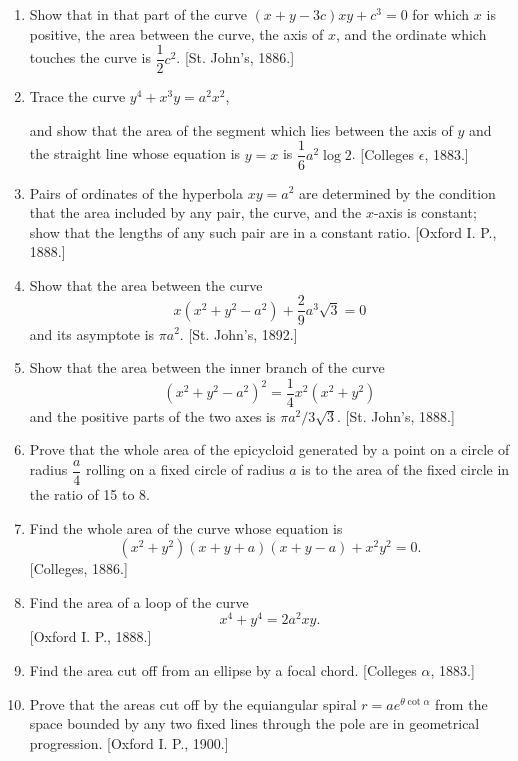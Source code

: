 \documentclass[11pt, a4paper]{article}
\newcommand{\source}[1]{\hfill\textnormal{[#1]}}
\begin{document}
\begin{enumerate}[leftmargin=2em]
\item Show that in that part of the curve $(x+y-3c)xy+c^3=0$ for which $x$ is positive, the area between the curve, the axis of $x$, and the ordinate which touches the curve is $\dfrac12c^2$. \source{St. John's, 1886.}

\item Trace the curve $y^4+x^3y=a^2x^2$,

and show that the area of the segment which lies between the axis of $y$ and the straight line whose equation is $y=x$ is $\dfrac16a^2\log2$. \source{Colleges $\epsilon$, 1883.}

\item Pairs of ordinates of the hyperbola $xy=a^2$ are determined by the condition that the area included by any pair, the curve, and the $x$-axis is constant; show that the lengths of any such pair are in a constant ratio. \source{Oxford I. P., 1888.}

\item Show that the area between the curve
\[
x(x^2+y^2-a^2)+\frac29a^3\sqrt3=0
\]
and its asymptote is $\pi a^2$. \source{St. John's, 1892.}

\item Show that the area between the inner branch of the curve
\[
(x^2+y^2-a^2)^2=\frac14x^2(x^2+y^2)
\]
and the positive parts of the two axes is $\pi a^2/3\sqrt3$. \source{St. John's, 1888.}

\item Prove that the whole area of the epicycloid generated by a point on a circle of radius $\dfrac{a}{4}$ rolling on a fixed circle of radius $a$ is to the area of the fixed circle in the ratio of 15 to 8.

\item Find the whole area of the curve whose equation is
\[
(x^2+y^2)(x+y+a)(x+y-a)+x^2y^2=0.
\]
\source{Colleges, 1886.}

\item Find the area of a loop of the curve
\[
x^4+y^4=2a^2xy.
\]
\source{Oxford I. P., 1888.}

\item Find the area cut off from an ellipse by a focal chord. \source{Colleges $\alpha$, 1883.}

\item Prove that the areas cut off by the equiangular spiral $r=ae^{\theta\cot\alpha}$ from the space bounded by any two fixed lines through the pole are in geometrical progression. \source{Oxford I. P., 1900.}


\end{enumerate}
\end{document}
